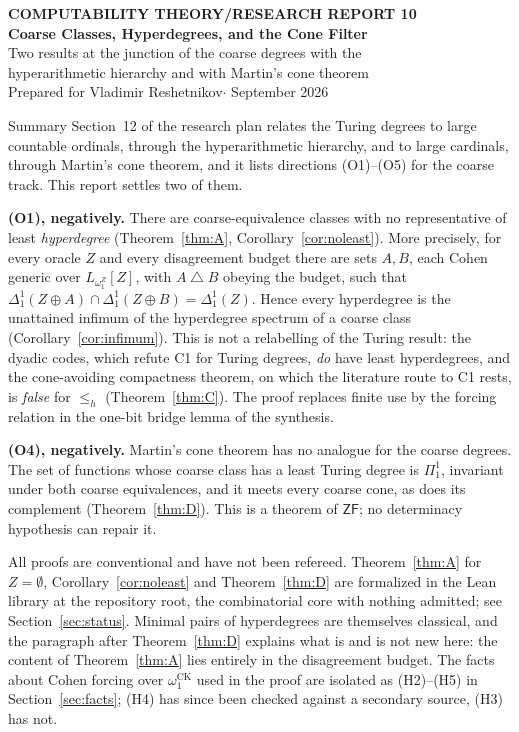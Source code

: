 \documentclass[11pt,letterpaper]{article}
\theoremstyle{definition}
\numberwithin{equation}{section}
\newcommand{\sd}{\mathbin{\triangle}}
\newcommand{\leh}{\le_{h}}
\newcommand{\Dh}{\Delta^1_1}
\newcommand{\omck}{\omega_1^{\mathrm{CK}}}
\begin{document}
\thispagestyle{plain}
\begin{center}
{\sffamily\small\bfseries\color{Steel}COMPUTABILITY THEORY\quad/\quad RESEARCH REPORT 10}\\[10pt]
{\fontsize{21}{26}\selectfont\bfseries\color{Navy}Coarse Classes, Hyperdegrees, and the Cone Filter}\\[7pt]
{\large\color{Ink}Two results at the junction of the coarse degrees with the\\ hyperarithmetic hierarchy and with Martin's cone theorem}\\[9pt]
{\color{Muted}Prepared for Vladimir Reshetnikov\quad$\cdot$ September 2026}
\end{center}
\vspace{2pt}
\begin{assessment}{Summary}
Section~12 of the research plan relates the Turing degrees to large countable ordinals, through the hyperarithmetic hierarchy, and to large cardinals, through Martin's cone theorem, and it lists directions (O1)--(O5) for the coarse track. This report settles two of them.

\textbf{(O1), negatively.} There are coarse-equivalence classes with no representative of least \emph{hyperdegree} (Theorem~\ref{thm:A}, Corollary~\ref{cor:noleast}). More precisely, for every oracle $Z$ and every disagreement budget there are sets $A,B$, each Cohen generic over $L_{\omega_1^Z}[Z]$, with $A\sd B$ obeying the budget, such that $\Dh(Z\oplus A)\cap\Dh(Z\oplus B)=\Dh(Z)$. Hence every hyperdegree is the unattained infimum of the hyperdegree spectrum of a coarse class (Corollary~\ref{cor:infimum}). This is not a relabelling of the Turing result: the dyadic codes, which refute C1 for Turing degrees, \emph{do} have least hyperdegrees, and the cone-avoiding compactness theorem, on which the literature route to C1 rests, is \emph{false} for $\leh$ (Theorem~\ref{thm:C}). The proof replaces finite use by the forcing relation in the one-bit bridge lemma of the synthesis.

\textbf{(O4), negatively.} Martin's cone theorem has no analogue for the coarse degrees. The set of functions whose coarse class has a least Turing degree is $\Pi^1_1$, invariant under both coarse equivalences, and it meets every coarse cone, as does its complement (Theorem~\ref{thm:D}). This is a theorem of $\mathsf{ZF}$; no determinacy hypothesis can repair it.

All proofs are conventional and have not been refereed. Theorem~\ref{thm:A} for $Z=\emptyset$, Corollary~\ref{cor:noleast} and Theorem~\ref{thm:D} are formalized in the Lean library  at the repository root, the combinatorial core with nothing admitted; see Section~\ref{sec:status}. Minimal pairs of hyperdegrees are themselves classical, and the paragraph after Theorem~\ref{thm:D} explains what is and is not new here: the content of Theorem~\ref{thm:A} lies entirely in the disagreement budget. The facts about Cohen forcing over $\omck$ used in the proof are isolated as (H2)--(H5) in Section~\ref{sec:facts}; (H4) has since been checked against a secondary source, (H3) has not.
\end{assessment}
{\small\tableofcontents}
\end{document}
